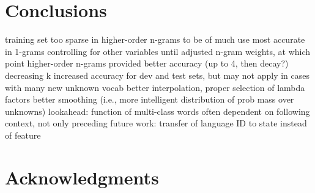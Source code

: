 \documentclass[11pt,a4paper]{article}
\begin{document}
\paragraph{}
  {\tiny\pgfplotstabletypeset[header=true]{\amacro}}

\paragraph{}

\paragraph{}
  {\tiny\pgfplotstabletypeset[header=true]{\fmacro}}

\section{Conclusions}

training set too sparse in higher-order n-grams to be of much use
most accurate in 1-grams controlling for other variables until adjusted n-gram weights, at which point higher-order n-grams provided better accuracy (up to 4, then decay?)
decreasing k increased accuracy for dev and test sets, but may not apply in cases with many new unknown vocab
better interpolation, proper selection of lambda factors
better smoothing (i.e., more intelligent distribution of prob mass over unknowns)
lookahead: function of multi-class words often dependent on following context, not only preceding
future work: transfer of language ID to state instead of feature

\section*{Acknowledgments}
\end{document}
